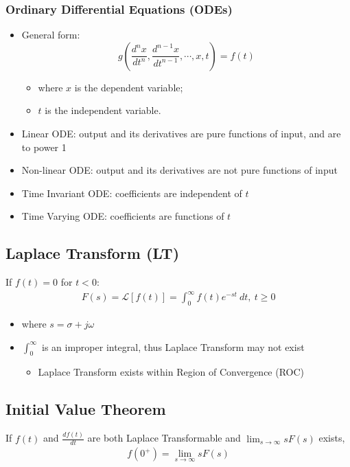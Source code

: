 \documentclass[a4paper]{article}
\begin{document}
\subsubsection{Ordinary Differential Equations (ODEs)}
\begin{itemize}
    \item General form:
    $$g\left(\frac{d^n x}{dt^n},\frac{d^{n-1}x}{dt^{n-1}},\cdots, x, t\right) = f(t)$$
    \begin{itemize}[label=$\circ$]
        \item where $x$ is the dependent variable;
        \item $t$ is the independent variable.
    \end{itemize}
    \item Linear ODE: output and its derivatives are pure functions of input, and are to power 1
    \item Non-linear ODE: output and its derivatives are not pure functions of input
    \item Time Invariant ODE: coefficients are independent of $t$
    \item Time Varying ODE: coefficients are functions of $t$
\end{itemize}
\subsection{Laplace Transform (LT)}
If $f(t) = 0$ for $t<0$:
\begin{align*}
    F(s) = \mathscr{L}[f(t)] = \int_{0}^{\infty}f(t)e^{-st}\ dt, \ t\geq 0
\end{align*}
\begin{itemize}
    \item where $s=\sigma +j\omega$
    \item $\displaystyle \int_0^\infty$ is an improper integral, thus Laplace Transform may not exist
    \begin{itemize}[label=$\circ$]
        \item Laplace Transform exists within Region of Convergence (ROC)
    \end{itemize}
\end{itemize}
\subsection{Initial Value Theorem}
If $f(t)$ and $\displaystyle\frac{df(t)}{dt}$ are both Laplace Transformable and $\displaystyle\lim_{s\rightarrow\infty} sF(s)$ exists,
\begin{align*}
    f(0^+) = \lim_{s\rightarrow\infty} sF(s)
\end{align*}
\end{document}

